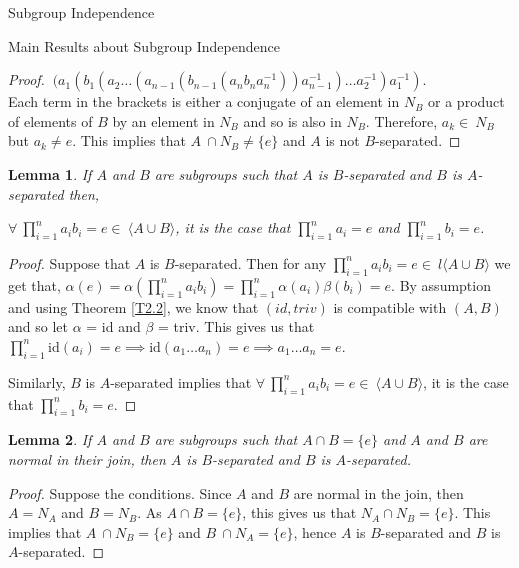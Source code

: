 \documentclass{article}
\newtheorem{lemma}{Lemma}[section]
\begin{document}
\begin{section}{Subgroup Independence}
\begin{subsection}{Main Results about Subgroup Independence}
\begin{proof}
				$ \ (a_1(b_1(a_2 \dots (a_{n-1}(b_{n-1}(a_nb_na_n^{-1})) a_{n-1}^{-1}) \dots a_2^{-1})a_1^{-1})$.\\
				
				Each term in the brackets is either a conjugate of an element in $N_B $ or a product of elements of $B$ by an element in $N_B $ and so is also in $N_B $. Therefore, $a_k \in \  N_B $ but $a_k \not = e$. This implies that $A \  \cap  N_B  \not = \{e \}$ and $A$ is not $B$-separated. 	
			\end{proof}
			
			
			
			
			
			
			\begin{lemma}\label{productsInJoin}
				If $A$ and $B$ are subgroups such that  $A$ is $B$-separated and $B$ is $A$-separated then, 
				
				$\forall \  \prod_{i=1}^{n}a_ib_i = e \in \ \langle A \cup B\rangle $, it is the case that $\prod_{i=1}^{n}a_i = e$ and $\prod_{i=1}^{n}b_i = e$.
			\end{lemma}
			
			\begin{proof}
				Suppose that $A$ is $B$-separated. Then for any $ \prod_{i=1}^{n}a_ib_i = e \in \ l\langle A \cup B\rangle $ we get that,  $ \alpha(e) = \alpha(\prod_{i=1}^{n}a_ib_i) =  \prod_{i=1}^{n}\alpha(a_i)\beta(b_i) = e.$ By assumption and using  Theorem \ref{T2.2}, we know that $(id, triv)$ is compatible with $(A, B)$ and so let $\alpha$ = id and $\beta$ = triv. This gives us that $\prod_{i=1}^{n}\text{id}(a_i) = e \implies \text{id}(a_1 \dots a_n) = e \implies a_1 \dots a_n = e$.
				
				Similarly, $B$ is $A$-separated implies that  $\forall \ \prod_{i=1}^{n} a_ib_i= e \in \ \langle A \cup B\rangle $, it is the case that  $\prod_{i=1}^{n}b_i= e$.
			\end{proof}
			
			
			\begin{lemma}\label{normalLemma1}
				If $A$ and $B$ are subgroups such that $A \cap B = \{e\}$ and $A$ and $B$ are normal in their join, then $A$ is $B$-separated and $B$ is $A$-separated.
				
			\end{lemma}
			
			
			
			\begin{proof}
				Suppose the conditions. Since $A$ and $B$ are normal in the join, then $A = N_A $ and $B = N_B $. As $A \cap B = \{e\}$, this gives us that $N_A  \cap  N_B  = \{e\}.$ This implies that $A\  \cap N_B  = \{e\}$ and  $B\  \cap N_A  = \{e\}$, hence $A$ is $B$-separated and $B$ is $A$-separated.
			\end{proof}
			

\end{subsection}
\end{section}
\end{document}

